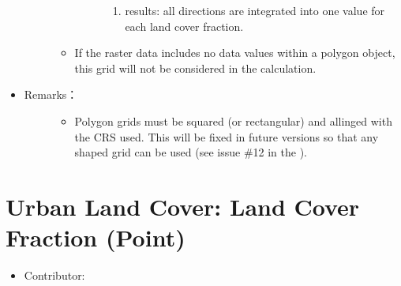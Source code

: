 \documentclass[letterpaper,10pt,english]{sphinxmanual}
\begin{document}
\begin{itemize}
\begin{description}
\begin{itemize}
\begin{description}
\begin{enumerate}
\item {} 
 results: all directions are integrated into one value for each land cover fraction.

\end{enumerate}

\end{description}

\item {} 
If the raster data includes no data values within a polygon object, this grid will not be considered in the calculation.

\end{itemize}

\end{description}

\item {} \begin{description}
\item[{Remarks：}] \leavevmode\begin{itemize}
\item {} \begin{description}
\item[{Polygon grids must be squared (or rectangular) and allinged with the CRS used. This will be fixed in future versions so that any shaped grid can be used (see issue \#12 in the ).}] \leavevmode
\begin{DUlineblock}{0em}
\item[] 
\end{DUlineblock}

\end{description}

\end{itemize}

\end{description}

\end{itemize}


\section{Urban Land Cover: Land Cover Fraction (Point)}
\label{\detokenize{pre-processor/Urban Land Cover Land Cover Fraction (Point):urban-land-cover-land-cover-fraction-point}}\label{\detokenize{pre-processor/Urban Land Cover Land Cover Fraction (Point):landcoverfraction-point}}\label{\detokenize{pre-processor/Urban Land Cover Land Cover Fraction (Point)::doc}}\begin{itemize}
\item {} 
Contributor:

\end{itemize}
\end{document}
